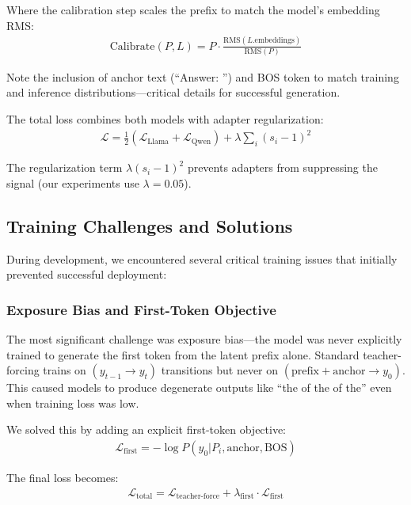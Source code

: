 \documentclass{article}
\begin{document}
Where the calibration step scales the prefix to match the model's embedding RMS:
\begin{align}
\text{Calibrate}(P, L) = P \cdot \frac{\text{RMS}(L.\text{embeddings})}{\text{RMS}(P)}
\end{align}

Note the inclusion of anchor text (``Answer: '') and BOS token to match training and inference distributions—critical details for successful generation.

The total loss combines both models with adapter regularization:
\begin{align}
\mathcal{L} = \frac{1}{2}(\mathcal{L}_{\text{Llama}} + \mathcal{L}_{\text{Qwen}}) + \lambda \sum_i (s_i - 1)^2
\end{align}

The regularization term $\lambda(s_i - 1)^2$ prevents adapters from suppressing the signal (our experiments use $\lambda=0.05$).

\subsection{Training Challenges and Solutions}

During development, we encountered several critical training issues that initially prevented successful deployment:

\subsubsection{Exposure Bias and First-Token Objective}

The most significant challenge was exposure bias—the model was never explicitly trained to generate the first token from the latent prefix alone. Standard teacher-forcing trains on $(y_{t-1} \rightarrow y_t)$ transitions but never on $(\text{prefix} + \text{anchor} \rightarrow y_0)$. This caused models to produce degenerate outputs like ``the of the of the'' even when training loss was low.

We solved this by adding an explicit first-token objective:
\begin{align}
\mathcal{L}_{\text{first}} = -\log P(y_0 | P_i, \text{anchor}, \text{BOS})
\end{align}

The final loss becomes:
\begin{align}
\mathcal{L}_{\text{total}} = \mathcal{L}_{\text{teacher-force}} + \lambda_{\text{first}} \cdot \mathcal{L}_{\text{first}}
\end{align}
\end{document}
